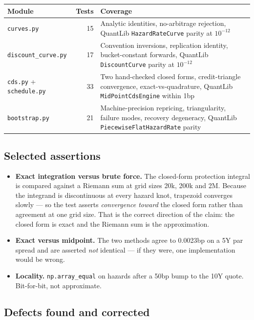\documentclass[11pt,a4paper]{article}
\begin{document}
\begin{center}
\begin{tabular}{lrp{8.2cm}}
\toprule
\textbf{Module} & \textbf{Tests} & \textbf{Coverage} \\
\midrule
\texttt{curves.py} & 15 & Analytic identities, no-arbitrage rejection, QuantLib \texttt{HazardRateCurve} parity at $10^{-12}$ \\
\texttt{discount\_curve.py} & 17 & Convention inversions, replication identity, bucket-constant forwards, QuantLib \texttt{DiscountCurve} parity at $10^{-12}$ \\
\texttt{cds.py} + \texttt{schedule.py} & 33 & Two hand-checked closed forms, credit-triangle convergence, exact-vs-quadrature, QuantLib \texttt{MidPointCdsEngine} within 1bp \\
\texttt{bootstrap.py} & 21 & Machine-precision repricing, triangularity, failure modes, recovery degeneracy, QuantLib \texttt{PiecewiseFlatHazardRate} parity \\
\bottomrule
\end{tabular}
\end{center}

\subsection{Selected assertions}

\begin{itemize}[leftmargin=1.4em,itemsep=0.2em]
\item \textbf{Exact integration versus brute force.} The closed-form protection integral is
compared against a Riemann sum at grid sizes 20k, 200k and 2M. Because the integrand is
discontinuous at every hazard knot, trapezoid converges slowly --- so the test asserts
\emph{convergence toward} the closed form rather than agreement at one grid size. That is the
correct direction of the claim: the closed form is exact and the Riemann sum is the
approximation.
\item \textbf{Exact versus midpoint.} The two methods agree to 0.0023bp on a 5Y par spread and
are asserted \emph{not} identical --- if they were, one implementation would be wrong.
\item \textbf{Locality.} \texttt{np.array\_equal} on hazards after a 50bp bump to the 10Y
quote. Bit-for-bit, not approximate.
\end{itemize}

\subsection{Defects found and corrected}
\end{document}
